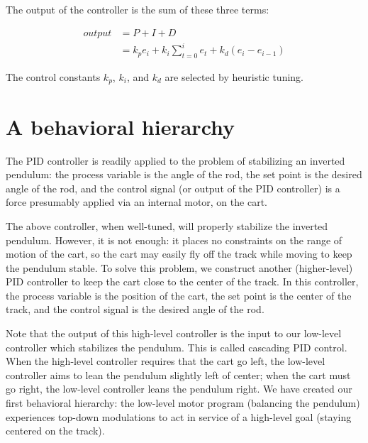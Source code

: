 \documentclass[12pt]{article}
\begin{document}
The output of the controller is the sum of these three terms:

\begin{align}
output &= P + I + D \\[5pt]
&= k_p e_i + k_i \sum_{t = 0}^{i} e_t + k_d (e_i - e_{i-1})
\end{align}

The control constants $k_p$, $k_i$, and $k_d$ are selected by heuristic tuning.

\section{A behavioral hierarchy}

The PID controller is readily applied to the problem of stabilizing an inverted pendulum: the process variable is the angle of the rod, the set point is the desired angle of the rod, and the control signal (or output of the PID controller) is a force presumably applied via an internal motor, on the cart.

The above controller, when well-tuned, will properly stabilize the inverted pendulum. However, it is not enough: it places no constraints on the range of motion of the cart, so the cart may easily fly off the track while moving to keep the pendulum stable. To solve this problem, we construct another (higher-level) PID controller to keep the cart close to the center of the track. In this controller, the process variable is the position of the cart, the set point is the center of the track, and the control signal is the desired angle of the rod.

Note that the output of this high-level controller is the input to our low-level controller which stabilizes the pendulum. This is called cascading PID control. When the high-level controller requires that the cart go left, the low-level controller aims to lean the pendulum slightly left of center; when the cart must go right, the low-level controller leans the pendulum right. We have created our first behavioral hierarchy: the low-level motor program (balancing the pendulum) experiences top-down modulations to act in service of a high-level goal (staying centered on the track).
\end{document}
